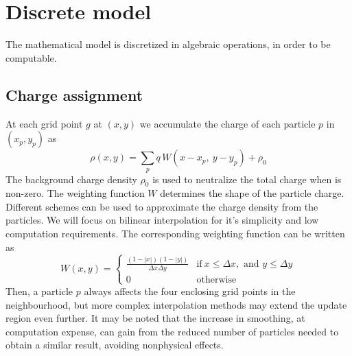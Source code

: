 \chapter{Discrete model}
\label{ch:discrete-model}

The mathematical model is discretized in algebraic operations, in order to be 
computable.

\section{Charge assignment}
At each grid point $g$ at $(x,y)$ we accumulate the charge of each particle $p$ 
in $(x_p, y_p)$ as
%
\begin{equation}%
\rho(x, y) = \sum_p q\,W(x - x_p,\ y - y_p) + \rho_0
\end{equation}%
%
The background charge density $\rho_0$ is used to neutralize the total charge 
when is non-zero. The weighting function $W$ determines the shape of the 
particle charge. Different schemes can be used to approximate the charge density 
from the particles. We will focus on bilinear interpolation for it's simplicity 
and low computation requirements. The corresponding weighting function can be 
written as
%
\begin{equation}%
W(x, y) =
\begin{cases}
			\displaystyle\frac{(1-|x|)(1-|y|)}{\Delta x \Delta y} & \text{if}\ x \le 
			\Delta x,\text{ and } y\le \Delta y \\
			0 & \text{otherwise}
\end{cases}
\end{equation}%
%
Then, a particle $p$ always affects the four enclosing grid points in the 
neighbourhood, but more complex interpolation methods may extend the update 
region even further. It may be noted that the increase in smoothing, at 
computation expense, can gain from the reduced number of particles needed to 
obtain a similar result, avoiding nonphysical effects.
%
